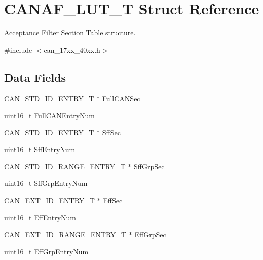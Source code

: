 \hypertarget{structCANAF__LUT__T}{\section{C\-A\-N\-A\-F\-\_\-\-L\-U\-T\-\_\-\-T Struct Reference}
\label{structCANAF__LUT__T}
}


Acceptance Filter Section Table structure.  




{\ttfamily \#include $<$can\-\_\-17xx\-\_\-40xx.\-h$>$}

\subsection*{Data Fields}
\begin{DoxyCompactItemize}
\item 
\hyperlink{structCAN__STD__ID__ENTRY__T}{C\-A\-N\-\_\-\-S\-T\-D\-\_\-\-I\-D\-\_\-\-E\-N\-T\-R\-Y\-\_\-\-T} $\ast$ \hyperlink{structCANAF__LUT__T_a7faf17c00ee110a91d7339aacd4fda41}{Full\-C\-A\-N\-Sec}
\item 
uint16\-\_\-t \hyperlink{structCANAF__LUT__T_ac8dfb97883a903ee82362da9abd4e863}{Full\-C\-A\-N\-Entry\-Num}
\item 
\hyperlink{structCAN__STD__ID__ENTRY__T}{C\-A\-N\-\_\-\-S\-T\-D\-\_\-\-I\-D\-\_\-\-E\-N\-T\-R\-Y\-\_\-\-T} $\ast$ \hyperlink{structCANAF__LUT__T_a34daf657f3d2a50e721daa0ab7dee994}{Sff\-Sec}
\item 
uint16\-\_\-t \hyperlink{structCANAF__LUT__T_aa5b3264e0fb44bbb7f3bf16ee367cc2e}{Sff\-Entry\-Num}
\item 
\hyperlink{structCAN__STD__ID__RANGE__ENTRY__T}{C\-A\-N\-\_\-\-S\-T\-D\-\_\-\-I\-D\-\_\-\-R\-A\-N\-G\-E\-\_\-\-E\-N\-T\-R\-Y\-\_\-\-T} $\ast$ \hyperlink{structCANAF__LUT__T_abcfa9b72b2a981e655551810d52c5fff}{Sff\-Grp\-Sec}
\item 
uint16\-\_\-t \hyperlink{structCANAF__LUT__T_ae7d8ed9ef4c6d5b4bef0be1068ea0c8d}{Sff\-Grp\-Entry\-Num}
\item 
\hyperlink{structCAN__EXT__ID__ENTRY__T}{C\-A\-N\-\_\-\-E\-X\-T\-\_\-\-I\-D\-\_\-\-E\-N\-T\-R\-Y\-\_\-\-T} $\ast$ \hyperlink{structCANAF__LUT__T_a30b5814a21e36ca7d9711c0752ff3f4e}{Eff\-Sec}
\item 
uint16\-\_\-t \hyperlink{structCANAF__LUT__T_a62d74093f87bfd355f53f143b022e3ce}{Eff\-Entry\-Num}
\item 
\hyperlink{structCAN__EXT__ID__RANGE__ENTRY__T}{C\-A\-N\-\_\-\-E\-X\-T\-\_\-\-I\-D\-\_\-\-R\-A\-N\-G\-E\-\_\-\-E\-N\-T\-R\-Y\-\_\-\-T} $\ast$ \hyperlink{structCANAF__LUT__T_a62a98cfd049ea67dd3b01d6e6f3871d5}{Eff\-Grp\-Sec}
\item 
uint16\-\_\-t \hyperlink{structCANAF__LUT__T_a48493bdab0f7818be7082e61284994d8}{Eff\-Grp\-Entry\-Num}
\end{DoxyCompactItemize}


